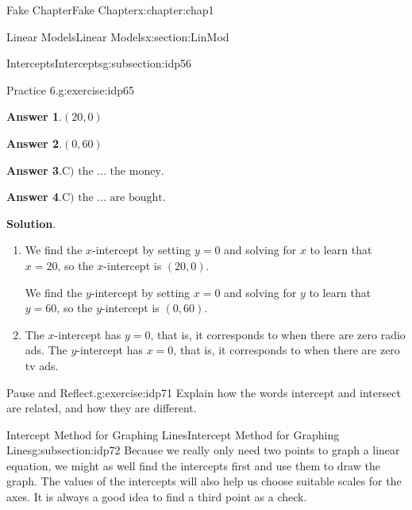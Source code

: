\documentclass[oneside,10pt,]{book}
\newcommand{\blocktitlefont}{\relax}
\numberwithin{equation}{section}
\begin{document}
\begin{chapterptx}{Fake Chapter}{}{Fake Chapter}{}{}{x:chapter:chap1}
\begin{sectionptx}{Linear Models}{}{Linear Models}{}{}{x:section:LinMod}
\begin{subsectionptx}{Intercepts}{}{Intercepts}{}{}{g:subsection:idp56}
\begin{inlineexercise}{Practice 6.}{g:exercise:idp65}
\begin{enumerate}[label=\alph*.]
\begin{itemize}[label=$\odot$,leftmargin=3em,]
\end{itemize}
%
\end{enumerate}
%
\par\smallskip%
\noindent\textbf{\blocktitlefont Answer 1}.\hypertarget{g:answer:idp66}{}\quad{}\(\left(20,0\right)\)%
\par\smallskip%
\noindent\textbf{\blocktitlefont Answer 2}.\hypertarget{g:answer:idp67}{}\quad{}\(\left(0,60\right)\)%
\par\smallskip%
\noindent\textbf{\blocktitlefont Answer 3}.\hypertarget{g:answer:idp68}{}\quad{}\(\text{C) the ... the money.}\)%
\par\smallskip%
\noindent\textbf{\blocktitlefont Answer 4}.\hypertarget{g:answer:idp69}{}\quad{}\(\text{C) the ... are bought.}\)%
\par\smallskip%
\noindent\textbf{\blocktitlefont Solution}.\hypertarget{g:solution:idp70}{}\quad{}%
\begin{enumerate}[label=\alph*.]
\item{}We find the \(x\)-intercept by setting \(y=0\) and solving for \(x\) to learn that \(x=20\text{,}\) so the \(x\)-intercept is \({\left(20,0\right)}\text{.}\)%
\par
We find the \(y\)-intercept by setting \(x=0\) and solving for \(y\) to learn that \(y=60\text{,}\) so the \(y\)-intercept is \({\left(0,60\right)}\text{.}\)%
\item{}The \(x\)-intercept has \(y=0\text{,}\) that is, it corresponds to when there are zero radio ads. The \(y\)-intercept has \(x=0\text{,}\) that is, it corresponds to when there are zero tv ads.%
\end{enumerate}
%
\end{inlineexercise}%
\begin{inlineexercise}{Pause and Reflect.}{g:exercise:idp71}%
Explain how the words intercept and intersect are related, and how they are different.%
\end{inlineexercise}%
\end{subsectionptx}
%
%
\typeout{************************************************}
\typeout{************************************************}
%
\begin{subsectionptx}{Intercept Method for Graphing Lines}{}{Intercept Method for Graphing Lines}{}{}{g:subsection:idp72}
Because we really only need two points to graph a linear equation, we might as well find the intercepts first and use them to draw the graph. The values of the intercepts will also help us choose suitable scales for the axes. It is always a good idea to find a third point as a check.%

\end{subsectionptx}
\end{sectionptx}
\end{chapterptx}
\end{document}
